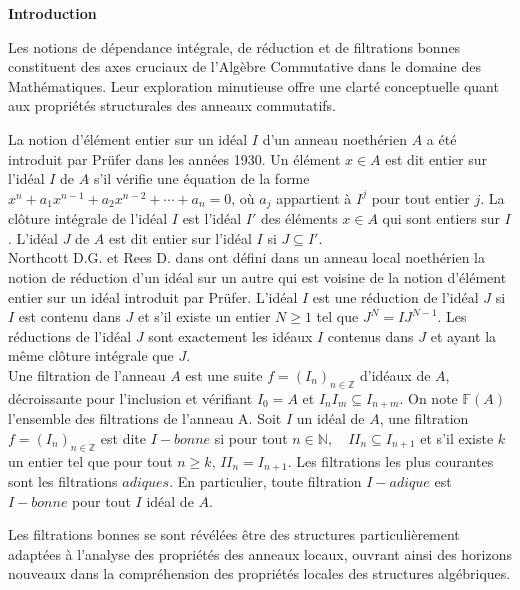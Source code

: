 \newpage
\tableofcontents
\renewcommand{\contentsname}{Table des matières}
\thispagestyle{empty}

\newpage

\setcounter{page}{0} 
\thispagestyle{empty}
\begin{center}
	\LARGE{\textbf{Introduction}}
\end{center}
\vspace{1cm}

Les notions de dépendance intégrale, de réduction et de filtrations bonnes constituent des axes cruciaux de l'Algèbre Commutative dans le domaine des Mathématiques. Leur exploration minutieuse offre une clarté conceptuelle quant aux propriétés structurales des anneaux commutatifs.

La notion d'élément entier sur un idéal $I$ d'un anneau noethérien $A$ a été introduit par Prüfer \cite{Pr} dans les années 1930. Un élément $x \in A $ est dit entier sur l'idéal $I$ de $A$ s'il vérifie une équation de la forme $x^n + a_1 x^{n-1} +a_2 x^{n-2}+ \cdots + a_n = 0$, où $a_j$ appartient à $I^j$ pour tout entier $j$. La clôture intégrale de l'idéal $I$ est l'idéal $I'$ des éléments $x \in A$ qui sont entiers sur $I$. L'idéal $J$ de $A$ est dit entier sur l'idéal $I$ si $J \subseteq I'$.\\ Northcott D.G. et Rees D. dans \cite{No} ont défini dans un anneau local noethérien la notion de réduction d'un idéal sur un autre qui est voisine de la notion d'élément entier sur un idéal introduit par Prüfer. L'idéal $I$ est une réduction de l'idéal $J$ si $I$ est contenu dans $J$ et s'il existe un entier $N \geqslant 1$ tel que $J^N = IJ^{N-1}$. Les réductions de l'idéal $J$ sont exactement les idéaux $I$ contenus dans $J$ et ayant la même clôture intégrale que $J$.\\
Une filtration de l'anneau $A$ est une suite $f=(I_n)_{n \in \mathbb{Z}}$ d'idéaux de $A$, décroissante pour l'inclusion et vérifiant $I_0 = A$ et $I_n I_m \subseteq I_{n+m}$. On note $\mathbb{F}(A)$ l'ensemble des filtrations de l'anneau A. Soit $I$ un idéal de $A$, une filtration $f=(I_n)_{n \in \mathbb{Z}}$ est dite $I-bonne$ si pour tout $n \in \mathbb{N}, \quad II_n \subseteq I_{n+1}$ et s'il existe $k$ un entier tel que pour tout $n \geqslant k$, $II_n = I_{n+1}$. Les filtrations les plus courantes sont les filtrations $adiques$. En particulier, toute filtration $I-adique$ est $I-bonne$ pour tout $I$ idéal de $A$.

Les filtrations bonnes se sont révélées être des structures particulièrement adaptées à l'analyse des propriétés des anneaux locaux, ouvrant ainsi des horizons nouveaux dans la compréhension des propriétés locales des structures algébriques.

